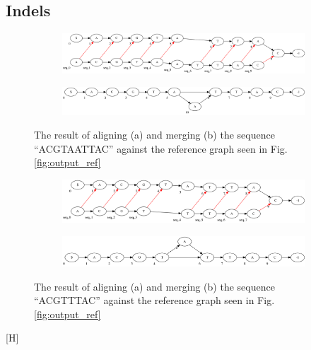 \documentclass[thesis.tex]{subfiles}
\begin{document}
\subsection{Indels}
\begin{figure}[H]
  \begin{subfigure}[t]{\textwidth}
    \begin{mdframed}
      \includegraphics[width=\textwidth]{outputs/insertion-alignment.png}
    \end{mdframed}
    \subcaption{}
  \end{subfigure}
  \begin{subfigure}[t]{\textwidth}
    \begin{mdframed}
      \includegraphics[width=\textwidth]{outputs/insertion-merge.png}
    \end{mdframed}
    \subcaption{}
  \end{subfigure}
  \caption{The result of aligning (a) and merging (b) the sequence ``ACGTAATTAC'' against the reference graph seen in Fig. \ref{fig:output_ref}}
  \label{fig:output_insertion}
\end{figure}
\begin{figure}[H]
  \begin{subfigure}[t]{\textwidth}
    \begin{mdframed}
      \includegraphics[width=\textwidth]{outputs/deletion-alignment.png}
    \end{mdframed}
    \subcaption{}
  \end{subfigure}
  \begin{subfigure}[t]{\textwidth}
    \begin{mdframed}
      \includegraphics[width=\textwidth]{outputs/deletion-merge.png}
    \end{mdframed}
    \subcaption{}
  \end{subfigure}
  \caption{The result of aligning (a) and merging (b) the sequence ``ACGTTTAC'' against the reference graph seen in Fig. \ref{fig:output_ref}}
  \label{fig:output_deletion}
\end{figure}[H]
\end{document}
